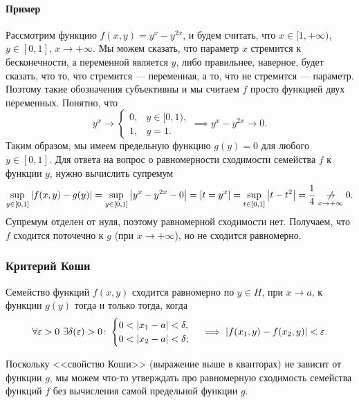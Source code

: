 \paragraph*{Пример}
Рассмотрим функцию $f(x, y) = y^{x} - y^{2x}$, и будем считать, что $x \in [1, +\infty)$, $y \in [0, 1]$, $x \to +\infty$.
Мы можем сказать, что параметр $x$ стремится к бесконечности, а переменной является $y$, либо правильнее, наверное, будет сказать, что то, что стремится --- переменная, а то, что не стремится --- параметр.
Поэтому такие обозначения субъективны и мы считаем $f$ просто функцией двух переменных.
Понятно, что
\[
    y^{x} \to \begin{cases}
        0, & y \in [0, 1), \\
        1, & y = 1.
    \end{cases} \implies y^{x} - y^{2x} \to 0.
\]
Таким образом, мы имеем предельную функцию $g(y) = 0$ для любого $y \in [0, 1]$.
Для ответа на вопрос о равномерности сходимости семейства $f$ к функции $g$, нужно вычислить супремум
\[
    \sup\limits_{y \in [0, 1]}\abs{f(x, y) - g(y)} = \sup\limits_{y \in [0, 1]}\abs{y^{x} - y^{2x} - 0} = [t = y^{x}] = \sup\limits_{t \in [0, 1]}\abs{t - t^{2}} = \frac{1}{4} \underset{x \to +\infty}{\centernot\to} 0.
\]
Супремум отделен от нуля, поэтому равномерной сходимости нет.
Получаем, что $f$ сходится поточечно к $g$ (при $x \to +\infty$), но не сходится равномерно.

\subsubsection{Критерий Коши}

\begin{theorem}
    Семейство функций $f(x, y)$ сходится равномерно по $y \in H$, при $x \to a$, к функции $g(y)$ тогда и только тогда, когда
    \[
        \forall \varepsilon > 0~ \exists \delta(\varepsilon) > 0 \colon \begin{cases}
            0 < \abs{x_{1} - a} < \delta, \\
            0 < \abs{x_{2} - a} < \delta;
        \end{cases} \implies \abs{f(x_{1}, y) - f(x_{2}, y)} < \varepsilon.
    \]
\end{theorem}

Поскольку <<свойство Коши>> (выражение выше в кванторах) не зависит от функции $g$, мы можем что-то утверждать про равномерную сходимость семейства функций $f$ без вычисления самой предельной функции $g$.

